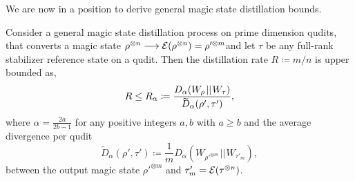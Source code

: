 \documentclass[pra,
aps,
twocolumn,
superscriptaddress,
groupedaddress,
nofootinbib,
reprint
]{revtex4-1}
\begin{document}
We are now in a position to derive general magic state distillation bounds.

\begingroup
\def\thetheorem{\ref{thm:entropic_bounds}}
\begin{theorem}
	Consider a general magic state distillation process on prime dimension qudits, that converts a magic state $\rho^{\otimes n} \longrightarrow {\mathcal E}(\rho^{\otimes n})=\rho'^{\otimes m}$and let $\tau$ be any full-rank stabilizer reference state on a qudit. Then the distillation rate $R \coloneqq m/n$ is upper bounded as,
	\begin{equation}
		R \leq R_\alpha \coloneqq \frac{D_{\alpha}(W_\rho \hspace{1pt}||\hspace{1pt} W_\tau)}{\rlap{\raisebox{-0.2ex}{$\widetilde{\phantom{D}}$}}D_\alpha( \rho', \tau')},
	\end{equation}
	where $\alpha = \frac{2a}{2b-1}$ for any positive integers $a,b$ with $a \geq b$ and the average divergence per qudit
	\begin{equation}
\widetilde{D}_\alpha( \rho', \tau') \coloneqq \frac{1}{m} D_\alpha (W_{\rho'^{\otimes m}} \hspace{1pt}||\hspace{1pt} W_{\tau'_m}),
\end{equation}
between the output magic state $\rho'^{\otimes m}$ and $\tau'_m = {\mathcal E}(\tau^{\otimes n})$.
\end{theorem}
\addtocounter{theorem}{-1}
\endgroup
\end{document}
